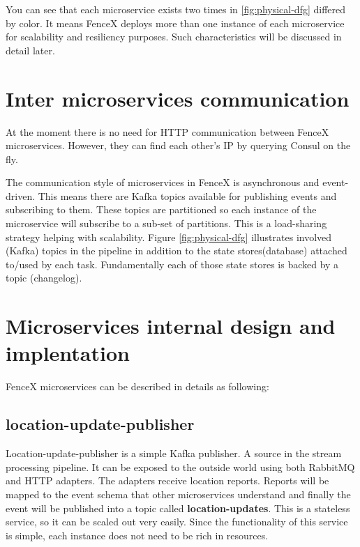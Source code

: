\documentclass[a4]{report}
\begin{document}
    You can see that each microservice exists two times in \ref{fig:physical-dfg} differed by color.
    It means FenceX deploys more than one instance of each microservice for scalability and resiliency purposes.
    Such characteristics will be discussed in detail later.


    \section{Inter microservices communication}
    At the moment there is no need for HTTP communication between FenceX microservices.
    However, they can find each other's IP by querying Consul\cite{Consul} on the fly.

    The communication style of microservices in FenceX is asynchronous and event-driven.
    This means there are Kafka topics available for publishing events and subscribing to them.
    These topics are partitioned so each instance of the microservice will subscribe to a sub-set of partitions.
    This is a load-sharing strategy helping with scalability.
    Figure \ref{fig:physical-dfg} illustrates involved (Kafka) topics in the pipeline in addition to the state stores(database) attached to/used by each task.
    Fundamentally each of those state stores is backed by a topic (changelog).


    \section{Microservices internal design and implentation}
    FenceX microservices can be described in details as following:

    \subsection{location-update-publisher}
    Location-update-publisher is a simple Kafka publisher.
    A source in the stream processing pipeline.
    It can be exposed to the outside world using both RabbitMQ and HTTP adapters.
    The adapters receive location reports.
    Reports will be mapped to the event schema that other microservices understand and finally the event will be published into a topic called \textbf{location-updates}.
    This is a stateless service, so it can be scaled out very easily.
    Since the functionality of this service is simple, each instance does not need to be rich in resources.
\end{document}
